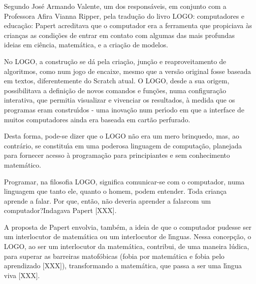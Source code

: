 \documentclass[
12pt,		%
openright,	%
twoside,  %
a4paper,			%
chapter=TITLE,		%
english,			%
french,				%
spanish,			%
brazil				%
]{USPSC-classe/USPSC}
\begin{document}
Segundo Jos\'e Armando Valente, um dos respons\'aveis, em conjunto com a Professora Afira Vianna Ripper, pela tradu\c{c}\~ao do livro LOGO: computadores e educa\c{c}\~ao: \textquotedbl Papert acreditava que o computador era a ferramenta que propiciava \`as crian\c{c}as as condi\c{c}\~oes de entrar em contato com algumas das mais profundas ideias em ci\^encia, matem\'atica, e a cria\c{c}\~ao de modelos\textquotedbl .










No LOGO, a constru\c{c}\~ao se d\'a pela cria\c{c}\~ao, jun\c{c}\~ao e reaproveitamento de algoritmos, como num jogo de encaixe, mesmo que a vers\~ao original fosse baseada em textos, diferentemente do Scratch atual. O LOGO, desde a sua origem, possibilitava a defini\c{c}\~ao de novos comandos e fun\c{c}\~oes, numa configura\c{c}\~ao interativa, que permitia visualizar e vivenciar os resultados, \`a medida que os programas eram constru\'{\i}dos  - uma inova\c{c}\~ao num per\'{\i}odo em que a interface de muitos computadores ainda era baseada em cart\~ao perfurado.










Desta forma, pode-se dizer que o LOGO n\~ao era um mero brinquedo, mas, ao contr\'ario, se constitu\'{\i}a em uma poderosa linguagem de computa\c{c}\~ao, planejada para fornecer acesso \`a programa\c{c}\~ao para principiantes e sem conhecimento matem\'atico.










Programar, na filosofia LOGO, significa \textquotedbl comunicar-se com o computador, numa linguagem que tanto ele, quanto o homem,  podem entender\textquotedbl . Toda crian\c{c}a aprende a falar. Por que, ent\~ao, n\~ao deveria aprender a \textquotedbl falar\textquotedbl  com um computador?\textquotedbl  Indagava Papert [XXX].










A proposta de Papert envolvia, tamb\'em, a ideia de que o computador pudesse ser um interlocutor  de matem\'atica ou um interlocutor de l\'{\i}nguas. Nessa concep\c{c}\~ao, o LOGO, ao ser um interlocutor da matem\'atica, contribui, de uma maneira l\'udica, para superar as barreiras matof\'obicas (fobia por matem\'atica e fobia pelo aprendizado [XXX]), transformando a matem\'atica, que passa a ser uma l\'{\i}ngua viva [XXX].
\end{document}
